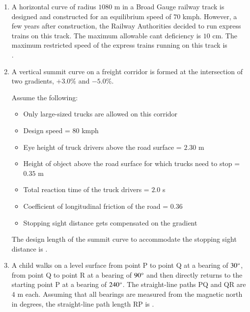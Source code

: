 \documentclass[journal,12pt,onecolumn]{article}
\theoremstyle{remark}
\begin{document}
\begin{enumerate}
    \item A horizontal curve of radius $1080$ m  in a Broad
    Gauge railway track is designed and constructed for an equilibrium speed of
    $70$ kmph. However, a few years after construction, the Railway Authorities decided
    to run express trains on this track. The maximum allowable cant deficiency is
    $10$ cm.
    The maximum restricted speed  of the express trains running on this track
    is \underline{\hspace{2cm}} \\ .
    
    \hfill{}
    
    \item A vertical summit curve on a freight corridor is formed at the intersection of two
    gradients, $+3.0\%$ and $-5.0\%$.
    
    Assume the following:
    \begin{itemize}
    \item Only large-sized trucks are allowed on this corridor
    
    \item Design speed = $80$ kmph
    
    \item Eye height of truck drivers above the road surface = $2.30$ m
    
    \item Height of object above the road surface for which trucks need to stop = $0.35$ m
    
    \item Total reaction time of the truck drivers = $2.0$ s
    
    \item Coefficient of longitudinal friction of the road = $0.36$
    
    \item Stopping sight distance gets compensated on the gradient
    \end{itemize}
    The design length of the summit curve  to accommodate the stopping sight
    distance is \underline{\hspace{2cm}} .
    
    \hfill{}
    
    \item A child walks on a level surface from point P to point Q at a bearing of $30\degree$, from
    point Q to point R at a bearing of $90\degree$ and then directly returns to the starting point P
    at a bearing of $240\degree$. The straight-line paths PQ and QR are $4$ m each. Assuming that
    all bearings are measured from the magnetic north in degrees, the straight-line path
    length RP  is \underline{\hspace{2cm}} .
    

\end{enumerate}
\end{document}
